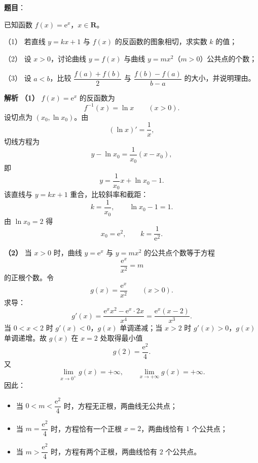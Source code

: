 \begin{answer}

\textbf{题目}：

已知函数 $f(x)=\mathrm e^x$，$x\in\mathbf R$。

（1） 若直线 $y=kx+1$ 与 $f(x)$ 的反函数的图象相切，求实数 $k$ 的值；

（2） 设 $x>0$，讨论曲线 $y=f(x)$ 与曲线 $y=mx^2$（$m>0$）公共点的个数；

（3） 设 $a<b$，比较 $\dfrac{f(a)+f(b)}2$ 与 $\dfrac{f(b)-f(a)}{b-a}$ 的大小，并说明理由。

\textbf{解析}
\textbf{（1）} $f(x)=\mathrm e^x$ 的反函数为
\nopagebreak[4]
\[f^{-1}(x)=\ln x\qquad(x>0).\]
设切点为 $(x_0,\ln x_0)$。由
\nopagebreak[4]
\[\left(\ln x\right)'=\frac1x,\]
切线方程为
\nopagebreak[4]
\[y-\ln x_0=\frac1{x_0}(x-x_0),\]
即
\nopagebreak[4]
\[y=\frac1{x_0}x+\ln x_0-1.\]
该直线与 $y=kx+1$ 重合，比较斜率和截距：
\nopagebreak[4]
\[k=\frac1{x_0},\qquad \ln x_0-1=1.\]
由 $\ln x_0=2$ 得
\nopagebreak[4]
\[x_0=\mathrm e^2,\qquad k=\frac1{\mathrm e^2}.\]

\textbf{（2）} 当 $x>0$ 时，曲线 $y=\mathrm e^x$ 与 $y=mx^2$ 的公共点个数等于方程
\nopagebreak[4]
\[\frac{\mathrm e^x}{x^2}=m\]
的正根个数。令
\nopagebreak[4]
\[g(x)=\frac{\mathrm e^x}{x^2}\qquad(x>0).\]
求导：
\nopagebreak[4]
\[g'(x)=\frac{\mathrm e^x x^2-\mathrm e^x\cdot2x}{x^4}
=\frac{\mathrm e^x(x-2)}{x^3}.\]
当 $0<x<2$ 时 $g'(x)<0$，$g(x)$ 单调递减；当 $x>2$ 时 $g'(x)>0$，$g(x)$ 单调递增。故 $g(x)$ 在 $x=2$ 处取得最小值
\nopagebreak[4]
\[g(2)=\frac{\mathrm e^2}{4}.\]
又
\nopagebreak[4]
\[\lim_{x\to0^+}g(x)=+\infty,\qquad
\lim_{x\to+\infty}g(x)=+\infty.\]
因此：

\begin{itemize}
\item 当 $0<m<\dfrac{\mathrm e^2}{4}$ 时，方程无正根，两曲线无公共点；
\item 当 $m=\dfrac{\mathrm e^2}{4}$ 时，方程恰有一个正根 $x=2$，两曲线恰有 $1$ 个公共点；
\item 当 $m>\dfrac{\mathrm e^2}{4}$ 时，方程有两个正根，两曲线恰有 $2$ 个公共点。
\end{itemize}


\end{answer}
